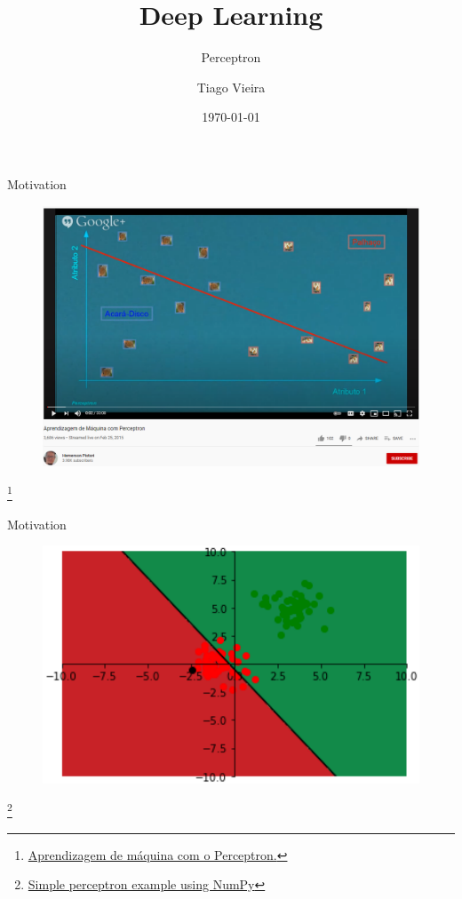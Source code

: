 \documentclass[aspectratio=169,mathserif]{beamer}
\title{Deep Learning}
\subtitle{Perceptron}
\author{Tiago Vieira}
\institute{Institute of Computing\\Universidade Federal de Alagoas}
\date{\today}
\begin{document}
\frame{\titlepage}


\begin{frame}{Motivation}
\begin{figure}[!]
\centering
\includegraphics[width=.7\textwidth]{ml-com-perceptron.png}
\end{figure}
\footnote{\href{https://www.youtube.com/watch?v=-C07ansuc-8}{Aprendizagem de máquina com o Perceptron.}}
\end{frame}


\begin{frame}{Motivation}
\begin{figure}[!]
\centering
\includegraphics[width=.7\textwidth]{perceptrong}
\end{figure}
\footnote{\href{https://github.com/tfvieira/deep-learning/blob/main/src/simple_perceptron/simple_perceptron.py}{Simple perceptron example using NumPy}}
\end{frame}
\end{document}
